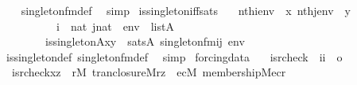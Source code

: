 \begin{isabellebody}
%
\isadelimproof
\ \ %
\endisadelimproof
%
\isatagproof
{}\isamarkupfalse%
\ singleton{\isacharunderscore}{\kern0pt}fm{\isacharunderscore}{\kern0pt}def\ \isamarkupfalse%
\ simp%
\endisatagproof
{\isafoldproof}%
%
\isadelimproof
\isanewline
%
\endisadelimproof
\isanewline
{}\isamarkupfalse%
\ is{\isacharunderscore}{\kern0pt}singleton{\isacharunderscore}{\kern0pt}iff{\isacharunderscore}{\kern0pt}sats{\isacharcolon}{\kern0pt}\isanewline
\ \ {\isachardoublequoteopen}{\isasymlbrakk}\ nth{\isacharparenleft}{\kern0pt}i{\isacharcomma}{\kern0pt}env{\isacharparenright}{\kern0pt}\ {\isacharequal}{\kern0pt}\ x{\isacharsemicolon}{\kern0pt}\ nth{\isacharparenleft}{\kern0pt}j{\isacharcomma}{\kern0pt}env{\isacharparenright}{\kern0pt}\ {\isacharequal}{\kern0pt}\ y{\isacharsemicolon}{\kern0pt}\isanewline
\ \ \ \ \ \ \ \ \ \ i\ {\isasymin}\ nat{\isacharsemicolon}{\kern0pt}\ j{\isasymin}nat\ {\isacharsemicolon}{\kern0pt}\ env\ {\isasymin}\ list{\isacharparenleft}{\kern0pt}A{\isacharparenright}{\kern0pt}{\isasymrbrakk}\isanewline
\ \ \ \ \ \ \ {\isasymLongrightarrow}\ is{\isacharunderscore}{\kern0pt}singleton{\isacharparenleft}{\kern0pt}{\isacharhash}{\kern0pt}{\isacharhash}{\kern0pt}A{\isacharcomma}{\kern0pt}x{\isacharcomma}{\kern0pt}y{\isacharparenright}{\kern0pt}\ {\isasymlongleftrightarrow}\ sats{\isacharparenleft}{\kern0pt}A{\isacharcomma}{\kern0pt}\ singleton{\isacharunderscore}{\kern0pt}fm{\isacharparenleft}{\kern0pt}i{\isacharcomma}{\kern0pt}j{\isacharparenright}{\kern0pt}{\isacharcomma}{\kern0pt}\ env{\isacharparenright}{\kern0pt}{\isachardoublequoteclose}\isanewline
%
\isadelimproof
\ \ %
\endisadelimproof
%
\isatagproof
{}\isamarkupfalse%
\ is{\isacharunderscore}{\kern0pt}singleton{\isacharunderscore}{\kern0pt}def\ singleton{\isacharunderscore}{\kern0pt}fm{\isacharunderscore}{\kern0pt}def\ \isamarkupfalse%
\ simp%
\endisatagproof
{\isafoldproof}%
%
\isadelimproof
\isanewline
%
\endisadelimproof
\isanewline
{}\isamarkupfalse%
\ forcing{\isacharunderscore}{\kern0pt}data\ \isanewline
\isanewline
\isanewline
{}\isamarkupfalse%
\isanewline
\ \ is{\isacharunderscore}{\kern0pt}rcheck\ {\isacharcolon}{\kern0pt}{\isacharcolon}{\kern0pt}\ {\isachardoublequoteopen}{\isacharbrackleft}{\kern0pt}i{\isacharcomma}{\kern0pt}i{\isacharbrackright}{\kern0pt}\ {\isasymRightarrow}\ o{\isachardoublequoteclose}\ \isanewline
\ \ {\isachardoublequoteopen}is{\isacharunderscore}{\kern0pt}rcheck{\isacharparenleft}{\kern0pt}x{\isacharcomma}{\kern0pt}z{\isacharparenright}{\kern0pt}\ {\isasymequiv}\ {\isasymexists}r{\isasymin}M{\isachardot}{\kern0pt}\ tran{\isacharunderscore}{\kern0pt}closure{\isacharparenleft}{\kern0pt}{\isacharhash}{\kern0pt}{\isacharhash}{\kern0pt}M{\isacharcomma}{\kern0pt}r{\isacharcomma}{\kern0pt}z{\isacharparenright}{\kern0pt}\ {\isasymand}\ {\isacharparenleft}{\kern0pt}{\isasymexists}ec{\isasymin}M{\isachardot}{\kern0pt}\ membership{\isacharparenleft}{\kern0pt}{\isacharhash}{\kern0pt}{\isacharhash}{\kern0pt}M{\isacharcomma}{\kern0pt}ec{\isacharcomma}{\kern0pt}r{\isacharparenright}{\kern0pt}\ {\isasymand}\isanewline

\end{isabellebody}
